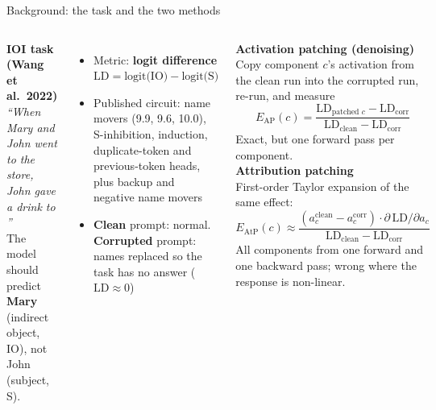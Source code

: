 \documentclass[aspectratio=169,10pt]{beamer}
\begin{document}
\begin{frame}{Background: the task and the two methods}
\begin{columns}[T]
\textbf{IOI task (Wang et al.\ 2022)}\\[2pt]
{\small\itshape ``When Mary and John went to the store, John gave a drink to \underline{\hspace{0.8cm}}''}\\[2pt]
The model should predict \textbf{Mary} (indirect object, IO), not John (subject, S).
\begin{itemize}
\item Metric: \textbf{logit difference} $\mathrm{LD}=\text{logit(IO)}-\text{logit(S)}$
\item Published circuit: name movers (9.9, 9.6, 10.0), S-inhibition, induction, duplicate-token and previous-token heads, plus backup and negative name movers
\item \textbf{Clean} prompt: normal. \textbf{Corrupted} prompt: names replaced so the task has no answer ($\mathrm{LD}\approx0$)
\end{itemize}
\textbf{Activation patching (denoising)}\\
Copy component $c$'s activation from the clean run into the corrupted run, re-run, and measure
\[
E_{\text{AP}}(c)=\frac{\mathrm{LD}_{\text{patched }c}-\mathrm{LD}_{\text{corr}}}{\mathrm{LD}_{\text{clean}}-\mathrm{LD}_{\text{corr}}}
\]
Exact, but one forward pass per component.\\[6pt]
\textbf{Attribution patching}\\
First-order Taylor expansion of the same effect:
\[
E_{\text{AtP}}(c)\approx\frac{(a^{\text{clean}}_c-a^{\text{corr}}_c)\cdot\partial\,\mathrm{LD}/\partial a_c}{\mathrm{LD}_{\text{clean}}-\mathrm{LD}_{\text{corr}}}
\]
All components from one forward and one backward pass; wrong where the response is non-linear.
\end{columns}
\end{frame}
\end{document}
